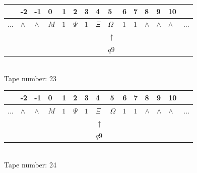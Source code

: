 \documentclass[11pt]{article}
\begin{document}
\begin{table}[H]
\centering
\begin{tabular}{lllllllllllllll}
 & -2 & -1 & 0 & 1 & 2 & 3 & 4 & 5 & 6 & 7 & 8 & 9 & 10 & \\
\hline
$...$ & \multicolumn{1}{|l|}{$\wedge$} & \multicolumn{1}{|l|}{$\wedge$} & \multicolumn{1}{|l|}{$M$} & \multicolumn{1}{|l|}{$1$} & \multicolumn{1}{|l|}{$\Psi$} & \multicolumn{1}{|l|}{$1$} & \multicolumn{1}{|l|}{$\Xi$} & \multicolumn{1}{|l|}{$\Omega$} & \multicolumn{1}{|l|}{$1$} & \multicolumn{1}{|l|}{$1$} & \multicolumn{1}{|l|}{$\wedge$} & \multicolumn{1}{|l|}{$\wedge$} & \multicolumn{1}{|l|}{$\wedge$} & $...$\\
\hline
&  &  &  &  &  &  &  & $\uparrow$ &  &  &  &  &  &  \\
&  &  &  &  &  &  &  & $ q9 $ &  &  &  &  &  &  \\
\end{tabular}
\\
Tape number: 23
\noindent\makebox[\linewidth]{\hdashrule{\textwidth}{1pt}{1pt}}\end{table}
\clearpage

\begin{table}[H]
\centering
\begin{tabular}{lllllllllllllll}
 & -2 & -1 & 0 & 1 & 2 & 3 & 4 & 5 & 6 & 7 & 8 & 9 & 10 & \\
\hline
$...$ & \multicolumn{1}{|l|}{$\wedge$} & \multicolumn{1}{|l|}{$\wedge$} & \multicolumn{1}{|l|}{$M$} & \multicolumn{1}{|l|}{$1$} & \multicolumn{1}{|l|}{$\Psi$} & \multicolumn{1}{|l|}{$1$} & \multicolumn{1}{|l|}{$\Xi$} & \multicolumn{1}{|l|}{$\Omega$} & \multicolumn{1}{|l|}{$1$} & \multicolumn{1}{|l|}{$1$} & \multicolumn{1}{|l|}{$\wedge$} & \multicolumn{1}{|l|}{$\wedge$} & \multicolumn{1}{|l|}{$\wedge$} & $...$\\
\hline
&  &  &  &  &  &  & $\uparrow$ &  &  &  &  &  &  &  \\
&  &  &  &  &  &  & $ q9 $ &  &  &  &  &  &  &  \\
\end{tabular}
\\
Tape number: 24
\noindent\makebox[\linewidth]{\hdashrule{\textwidth}{1pt}{1pt}}\end{table}
\end{document}
